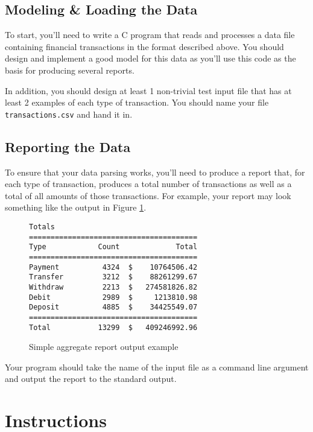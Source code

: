 \documentclass[12pt]{scrartcl}
\begin{document}
\subsection*{Modeling \& Loading the Data}

To start, you'll need to write a C program that reads and processes 
a data file containing financial transactions in the format described above.  
You should design and implement a good model for this data as you'll use 
this code as the basis for producing several reports.

In addition, you should design at least 1 non-trivial test input file that 
has at least 2 examples of each type of transaction.  You should name your
file \texttt{transactions.csv} and hand it in.

\subsection*{Reporting the Data}

To ensure that your data parsing works, you'll need to produce a report
that, for each type of transaction, produces a total number of transactions 
as well as a total of all amounts of those transactions.  For example, 
your report may look something like the output in Figure 
\ref{figure:simpleReport}.

\begin{figure}[ht]
\begin{verbatim}
Totals 
=======================================
Type            Count             Total
=======================================
Payment          4324  $    10764506.42
Transfer         3212  $    88261299.67
Withdraw         2213  $   274581826.82
Debit            2989  $     1213810.98
Deposit          4885  $    34425549.07
=======================================
Total           13299  $   409246992.96
\end{verbatim}
\caption{Simple aggregate report output example}
\label{figure:simpleReport}
\end{figure}

Your program should take the name of the input file as a command line argument
and output the report to the standard output.


\section*{Instructions}
\end{document}
